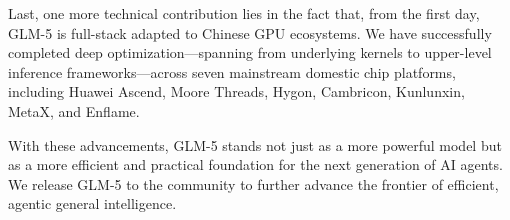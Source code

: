 Last, one more technical contribution lies in the fact that, from the first day, GLM-5 is full-stack adapted to Chinese GPU ecosystems. We have successfully completed deep optimization—spanning from underlying kernels to upper-level inference frameworks—across seven mainstream domestic chip platforms, including Huawei Ascend, Moore Threads, Hygon, Cambricon, Kunlunxin, MetaX, and Enflame.

With these advancements, GLM-5 stands not just as a more powerful model but as a more efficient and practical foundation for the next generation of AI agents. We release GLM-5 to the community to further advance the frontier of efficient, agentic general intelligence.
